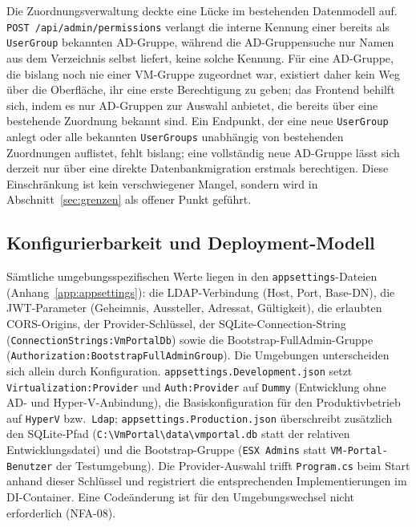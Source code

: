 \documentclass[12pt,a4paper]{article}
\begin{document}
Die Zuordnungsverwaltung deckte eine Lücke im bestehenden Datenmodell auf. \texttt{POST~/api/admin/permissions} verlangt die interne Kennung einer bereits als \texttt{UserGroup} bekannten AD-Gruppe, während die AD-Gruppensuche nur Namen aus dem Verzeichnis selbst liefert, keine solche Kennung. Für eine AD-Gruppe, die bislang noch nie einer VM-Gruppe zugeordnet war, existiert daher kein Weg über die Oberfläche, ihr eine erste Berechtigung zu geben; das Frontend behilft sich, indem es nur AD-Gruppen zur Auswahl anbietet, die bereits über eine bestehende Zuordnung bekannt sind. Ein Endpunkt, der eine neue \texttt{UserGroup} anlegt oder alle bekannten \texttt{UserGroups} unabhängig von bestehenden Zuordnungen auflistet, fehlt bislang; eine vollständig neue AD-Gruppe lässt sich derzeit nur über eine direkte Datenbankmigration erstmals berechtigen. Diese Einschränkung ist kein verschwiegener Mangel, sondern wird in Abschnitt~\ref{sec:grenzen} als offener Punkt geführt.

\subsection{Konfigurierbarkeit und Deployment-Modell}
\label{sec:deployment}

Sämtliche umgebungsspezifischen Werte liegen in den \texttt{appsettings}-Dateien (Anhang~\ref{app:appsettings}): die LDAP-Verbindung (Host, Port, Base-DN), die JWT-Parameter (Geheimnis, Aussteller, Adressat, Gültigkeit), die erlaubten CORS-Origins, der Provider-Schlüssel, der SQLite-Connection-String (\texttt{ConnectionStrings:VmPortalDb}) sowie die Bootstrap-FullAdmin-Gruppe (\texttt{Authorization:BootstrapFullAdminGroup}). Die Umgebungen unterscheiden sich allein durch Konfiguration. \texttt{appsettings.Development.json} setzt \texttt{Virtualization:Provider} und \texttt{Auth:Provider} auf \texttt{Dummy} (Entwicklung ohne AD- und Hyper-V-Anbindung), die Basiskonfiguration für den Produktivbetrieb auf \texttt{HyperV} bzw.\ \texttt{Ldap}; \texttt{appsettings.Production.json} überschreibt zusätzlich den SQLite-Pfad (\texttt{C:\textbackslash VmPortal\textbackslash data\textbackslash vmportal.db} statt der relativen Entwicklungsdatei) und die Bootstrap-Gruppe (\texttt{ESX Admins} statt \texttt{VM-Portal-Benutzer} der Testumgebung). Die Provider-Auswahl trifft \texttt{Program.cs} beim Start anhand dieser Schlüssel und registriert die entsprechenden Implementierungen im DI-Container. Eine Codeänderung ist für den Umgebungswechsel nicht erforderlich (NFA-08).
\end{document}
